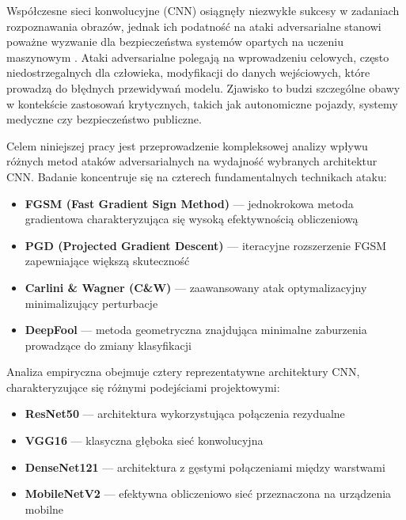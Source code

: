 \documentclass[12pt]{article}
\begin{document}
Współczesne sieci konwolucyjne (CNN) osiągnęły niezwykłe sukcesy w zadaniach rozpoznawania obrazów, jednak ich podatność na ataki adversarialne stanowi poważne wyzwanie dla bezpieczeństwa systemów opartych na uczeniu maszynowym \supercite{szegedy2013intriguing}. Ataki adversarialne polegają na wprowadzeniu celowych, często niedostrzegalnych dla człowieka, modyfikacji do danych wejściowych, które prowadzą do błędnych przewidywań modelu. Zjawisko to budzi szczególne obawy w kontekście zastosowań krytycznych, takich jak autonomiczne pojazdy, systemy medyczne czy bezpieczeństwo publiczne.

Celem niniejszej pracy jest przeprowadzenie kompleksowej analizy wpływu różnych metod ataków adversarialnych na wydajność wybranych architektur CNN. Badanie koncentruje się na czterech fundamentalnych technikach ataku:

\begin{itemize}
    \item \textbf{FGSM (Fast Gradient Sign Method)} \supercite{goodfellow2014explaining} --- jednokrokowa metoda gradientowa charakteryzująca się wysoką efektywnością obliczeniową
    \item \textbf{PGD (Projected Gradient Descent)} \supercite{madry2017towards} --- iteracyjne rozszerzenie FGSM zapewniające większą skuteczność
    \item \textbf{Carlini \& Wagner (C\&W)} \supercite{carlini2017towards} --- zaawansowany atak optymalizacyjny minimalizujący perturbacje
    \item \textbf{DeepFool} \supercite{moosavi2016deepfool} --- metoda geometryczna znajdująca minimalne zaburzenia prowadzące do zmiany klasyfikacji
\end{itemize}

Analiza empiryczna obejmuje cztery reprezentatywne architektury CNN, charakteryzujące się różnymi podejściami projektowymi:

\begin{itemize}
    \item \textbf{ResNet50} --- architektura wykorzystująca połączenia rezydualne
    \item \textbf{VGG16} --- klasyczna głęboka sieć konwolucyjna
    \item \textbf{DenseNet121} --- architektura z gęstymi połączeniami między warstwami
    \item \textbf{MobileNetV2} --- efektywna obliczeniowo sieć przeznaczona na urządzenia mobilne
\end{itemize}
\end{document}
